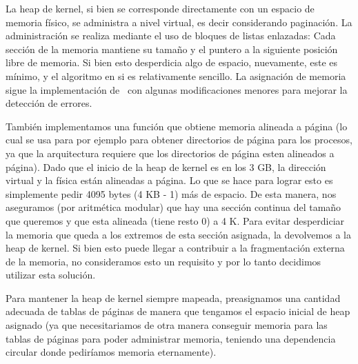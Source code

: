 La heap de kernel, si bien se corresponde directamente con un espacio de memoria f\'isico, se administra a nivel virtual, es decir considerando
paginaci\'on. La administraci\'on se realiza mediante el uso de bloques de listas enlazadas: Cada secci\'on de la memoria mantiene su tama\~no
y el puntero a la siguiente posici\'on libre de memoria. Si bien esto desperdicia algo de espacio, nuevamente, este es m\'inimo, y el algoritmo
en si es relativamente sencillo. La asignaci\'on de memoria sigue la implementaci\'on de~\cite{kr} con algunas modificaciones menores para
mejorar la detecci\'on de errores. 

Tambi\'en implementamos una funci\'on que obtiene memoria alineada a p\'agina (lo cual se usa para por ejemplo para obtener directorios de p\'agina para los procesos, ya que la arquitectura requiere que los directorios de p\'agina esten alineados a p\'agina). Dado que el inicio de la heap de kernel es en los 3 GB, la direcci\'on virtual y la f\'isica est\'an alineadas a p\'agina. Lo que se hace para lograr esto es simplemente
pedir 4095 bytes (4 KB - 1) m\'as de espacio. De esta manera, nos aseguramos (por aritm\'etica modular) que hay una secci\'on continua del
tama\~no que queremos y que esta alineada (tiene resto 0) a 4 K. Para evitar desperdiciar la memoria que queda a los extremos de esta secci\'on
asignada, la devolvemos a la heap de kernel. Si bien esto puede llegar a contribuir a la fragmentaci\'on externa de la memoria, no consideramos esto un requisito y por lo tanto decidimos utilizar esta soluci\'on.

Para mantener la heap de kernel siempre mapeada, preasignamos una cantidad adecuada de tablas de p\'aginas de manera que tengamos el espacio
inicial de heap asignado (ya que necesitariamos de otra manera conseguir memoria para las tablas de p\'aginas para poder administrar memoria,
teniendo una dependencia circular donde pedir\'iamos memoria eternamente).

